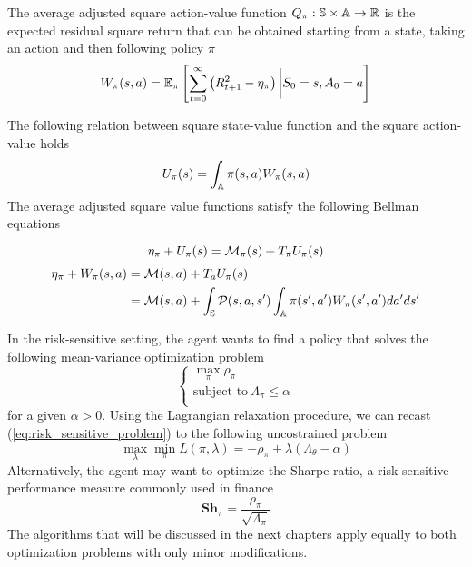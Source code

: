 \begin{definition}
	The average adjusted square action-value function $Q_\pi : \S \times \A \to 
	\R$ is the expected residual square return that can be obtained starting from a
	state, taking an action and then following policy $\pi$
	\begin{equation}
		W_\pi(s, a) = \E[\pi]{\sum^{\infty}_{t=0} \left(R_{t+1}^2 -
			\eta_\pi\right) \bigg| S_0 = s, A_0 = a}
	\end{equation}
\end{definition}
The following relation between square state-value function and the square action-value holds
\begin{equation}\label{eq:UW_equality}
	U_\pi(s) = \int_\A \pi(s,a) W_\pi(s,a)
\end{equation}
The average adjusted square value functions satisfy the following Bellman equations
\begin{proposition}
	\begin{equation}
		\eta_\pi + U_\pi(s) = \calM_\pi(s) + T_\pi U_\pi(s)
	\end{equation}
	\begin{equation}
		\begin{split}
			\eta_\pi + W_\pi(s,a) &= \calM(s,a) + T_a U_\pi(s)\\
			&= \calM(s,a) + \int_{\S} \calP(s,a,s') \int_{\A} \pi(s',a') W_\pi(s',a') da' ds'
		\end{split}
	\end{equation}
\end{proposition}
In the risk-sensitive setting, the agent wants to find a policy that solves the 
following mean-variance optimization problem
\begin{equation}\label{eq:risk_sensitive_problem}
	\begin{cases}
		\max_\pi \rho_\pi\\
		\text{subject to}\ \Lambda_\pi \leq \alpha\\
	\end{cases}
\end{equation}
for a given $\alpha > 0$. Using the Lagrangian relaxation procedure, we can 
recast (\ref{eq:risk_sensitive_problem}) to the following uncostrained problem
\begin{equation}
	\max_\lambda \min_\pi L(\pi, \lambda) = - \rho_\pi + \lambda 
	(\Lambda_\theta - \alpha)
\end{equation}
Alternatively, the agent may want to optimize the Sharpe ratio, a risk-sensitive performance measure commonly used in finance
\begin{equation}
	\textbf{Sh}_\pi = \frac{\rho_\pi}{\sqrt{\Lambda_\pi}} 
\end{equation}
The algorithms that will be discussed in the next chapters apply equally to both optimization problems with only minor modifications. 